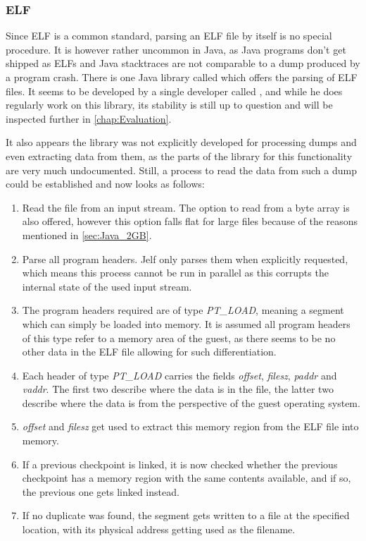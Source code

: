 \subsubsection{ELF}
Since ELF is a common standard, parsing an ELF file by itself is no special procedure.
It is however rather uncommon in Java, as Java programs don't get shipped as ELFs
and Java stacktraces are not comparable to a dump produced by a program crash.
There is one Java library called  which offers the parsing of ELF files.
It seems to be developed by a single developer called ,
and while he does regularly work on this library,
its stability is still up to question and will be inspected further in \autoref{chap:Evaluation}\cite{jelf}.

It also appears the library was not explicitly developed for processing dumps
and even extracting data from them,
as the parts of the library for this functionality are very much undocumented.
Still, a process to read the data from such a dump could be established and now looks as follows:
\begin{enumerate}
    \item Read the file from an input stream.
    The option to read from a byte array is also offered,
    however this option falls flat for large files because of the reasons mentioned in \autoref{sec:Java_2GB}.
    \item Parse all program headers. Jelf only parses them when explicitly requested,
    which means this process cannot be run in parallel as this corrupts the internal state of the used input stream.
    \item The program headers required are of type \emph{PT\_LOAD},
    meaning a segment which can simply be loaded into memory.
    It is assumed all program headers of this type refer to a memory area of the guest,
    as there seems to be no other data in the ELF file allowing for such differentiation.
    \item Each header of type \emph{PT\_LOAD} carries the fields
    \emph{offset}, \emph{filesz}, \emph{paddr} and \emph{vaddr}.
    The first two describe where the data is in the file,
    the latter two describe where the data is from the perspective of the guest operating system.
    \item \emph{offset} and \emph{filesz} get used to extract this memory region from the ELF file into memory.
    \item If a previous checkpoint is linked, it is now checked
    whether the previous checkpoint has a memory region with the same contents available,
    and if so, the previous one gets linked instead.
    \item If no duplicate was found,
    the segment gets written to a file at the specified location,
    with its physical address getting used as the filename.
\end{enumerate}

